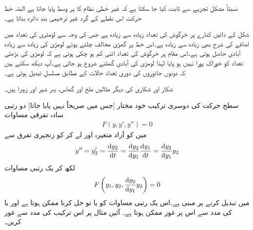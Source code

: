 نسبتاً مشکل تجزیے سے ثابت کیا جا سکتا ہے کہ غیر خطی نظام  کا   پر وسط پایا جاتا ہے البتہ خط حرکت اس نقطے کے گرد غیر ترخیمی بند دائرہ بناتا ہے۔

شکل  کے دائیں کنارے پر خرگوش کی تعداد  زیادہ سے زیادہ ہے جس کی وجہ سے لومٹری کی تعداد  میں اضافے کی شرح بھی زیادہ سے زیادہ ہے۔اس خط پر گھڑی مخالف  چلتے ہوئے لومڑی کی زیادہ سے زیادہ آبادی حاصل ہوتی ہے۔اس مقام پر خرگوش کی تعداد اتنی کم ہو چکی ہوتی ہے کہ لومڑی کی بڑھتی تعداد کو خوراک پورا نہیں ہو پایا لہٰذا لومڑی کی آبادی گھٹنے شروع ہو جاتی ہے۔آپ دیکھ سکتے ہیں کہ دونوں جانوروں کی دوری تعداد حالات کے مطابق مسلسل تبدیل ہوتی ہے۔

شکار اور شکاری کی دیگر مثالیں ملخ اور گھاس، ببر شیر اور زیبرا ہیں۔


سطح حرکت کی دوسری ترکیب خود مختار [جس میں  صریحاً نہیں پایا جاتا] دو رتبی سادہ تفرقی مساوات
\begin{align*}
F(y,y',y'')=0
\end{align*}
میں  کو آزاد متغیرہ اور  لے کر  کو زنجیری تفرق سے
\begin{align*}
y''=y_2'=\frac{\dif y_2}{\dif t}=\frac{\dif y_2}{\dif y_1}\frac{\dif y_1}{\dif t}=\frac{\dif y_2}{\dif y_1}y_2
\end{align*}
لکھ کر یک رتبی مساوات
\begin{align}
F\left(y_1,y_2,\frac{\dif y_2}{\dif y_1}y_2\right)=0
\end{align}
میں تبدیل کرنے پر مبنی ہے۔اس یک رتبی مساوات کو یا تو حل کرنا ممکن ہوتا ہے اور یا  کی مدد سے اس پر غور ممکن ہوتا ہے۔ آئیں مثال  پر اس ترکیب کی مدد سے غور کریں۔

